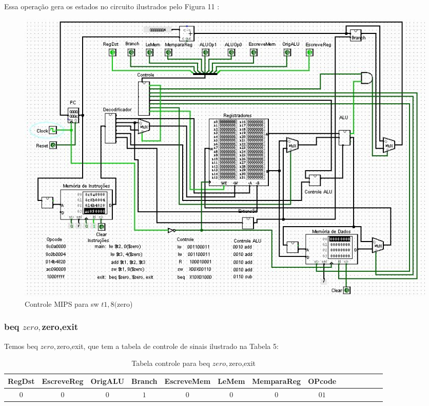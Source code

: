 \documentclass[
	article,
	11pt,
	oneside,
	a4paper,
	english,
	brazil,
	]{abntex2}
\begin{document}
Essa operação gera os estados no circuito ilustrados pelo Figura 11 : 

        \begin{figure}[!htb]
        \centering
        \includegraphics[scale=0.5]{imagens/teste_4.JPG}
        \caption{Controle MIPS para sw $t1,8($zero)}
        \label{fig:hostnetid}
        \end{figure}

\subsubsection{beq $zero,$zero,exit}
Temos beq $zero,$zero,exit, que tem a tabela de controle de sinais ilustrado na Tabela 5:

\begin{table}[h!]
  \centering
  \begin{adjustbox}{max width=\textwidth}
  \begin{tabular}{*{14}{|c}|}%
  \hline
  RegDst & EscreveReg &OrigALU & Branch & EscreveMem & LeMem & MemparaReg & OPcode\\
  \hline
  \hline
  $0$ & $0$ & $0$ & $1$ & $0$ & $0$ & $0$ &
  $01$ \\
  \hline
\end{tabular}
\end{adjustbox}
  \caption{Tabela controle para beq $zero,$zero,exit}
  \label{tab:label_test}
\end{table}
\end{document}
